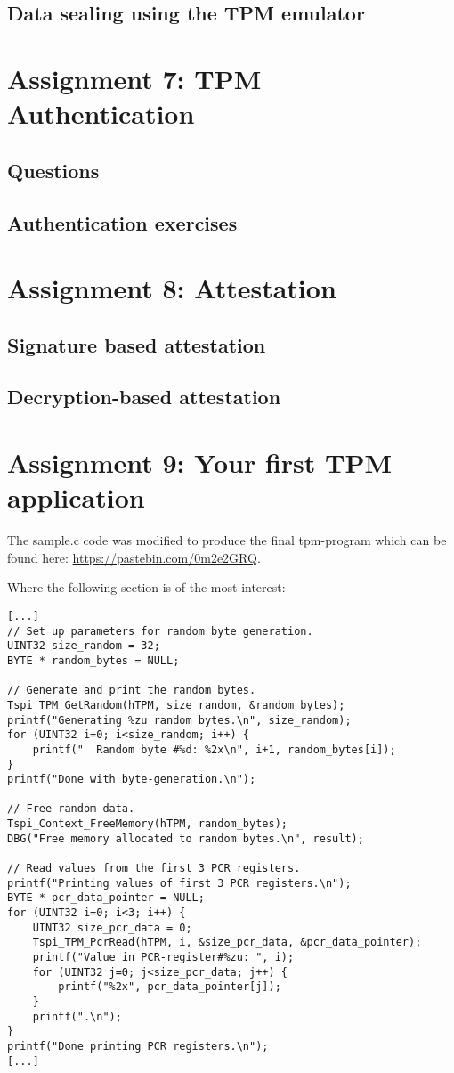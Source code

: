\documentclass[10pt]{article}
\begin{document}
\subsection{Data sealing using the TPM emulator}
\section{Assignment 7: TPM Authentication}
\subsection{Questions}
\subsection{Authentication exercises}
\section{Assignment 8: Attestation}
\subsection{Signature based attestation}
\subsection{Decryption-based attestation}
\section{Assignment 9: Your first TPM application}

The sample.c code was modified to produce the final tpm-program which can be
found here: \url{https://pastebin.com/0m2e2GRQ}.

Where the following section is of the most interest:

\begin{lstlisting}
[...]
// Set up parameters for random byte generation.
UINT32 size_random = 32;
BYTE * random_bytes = NULL;

// Generate and print the random bytes.
Tspi_TPM_GetRandom(hTPM, size_random, &random_bytes);
printf("Generating %zu random bytes.\n", size_random);
for (UINT32 i=0; i<size_random; i++) {
    printf("  Random byte #%d: %2x\n", i+1, random_bytes[i]);
}
printf("Done with byte-generation.\n");

// Free random data.
Tspi_Context_FreeMemory(hTPM, random_bytes);
DBG("Free memory allocated to random bytes.\n", result);

// Read values from the first 3 PCR registers.
printf("Printing values of first 3 PCR registers.\n");
BYTE * pcr_data_pointer = NULL;
for (UINT32 i=0; i<3; i++) {
    UINT32 size_pcr_data = 0;
    Tspi_TPM_PcrRead(hTPM, i, &size_pcr_data, &pcr_data_pointer);
    printf("Value in PCR-register#%zu: ", i);
    for (UINT32 j=0; j<size_pcr_data; j++) {
        printf("%2x", pcr_data_pointer[j]);
    }
    printf(".\n");
}
printf("Done printing PCR registers.\n");
[...]
\end{lstlisting}
\end{document}

